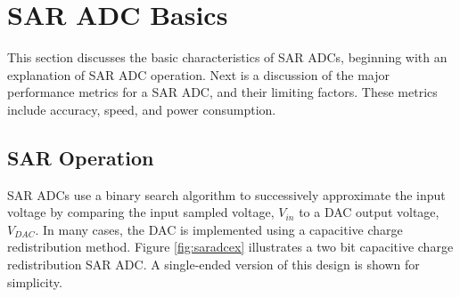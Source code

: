 \section{SAR ADC Basics}
\label{sec:saradcbasics}
This section discusses the basic characteristics of SAR ADCs, beginning with an explanation of SAR ADC operation. Next is a discussion of the major performance metrics for a SAR ADC, and their limiting factors. These metrics include accuracy, speed, and power consumption.
\subsection{SAR Operation}
\label{sec:saroperation}
SAR ADCs use a binary search algorithm to successively approximate the input voltage by comparing the input sampled voltage, $V_{in}$ to a DAC output voltage, $V_{DAC}$. In many cases, the DAC is implemented using a capacitive charge redistribution method. Figure \ref{fig:saradcex} illustrates a two bit capacitive charge redistribution SAR ADC. A single-ended version of this design is shown for simplicity.
